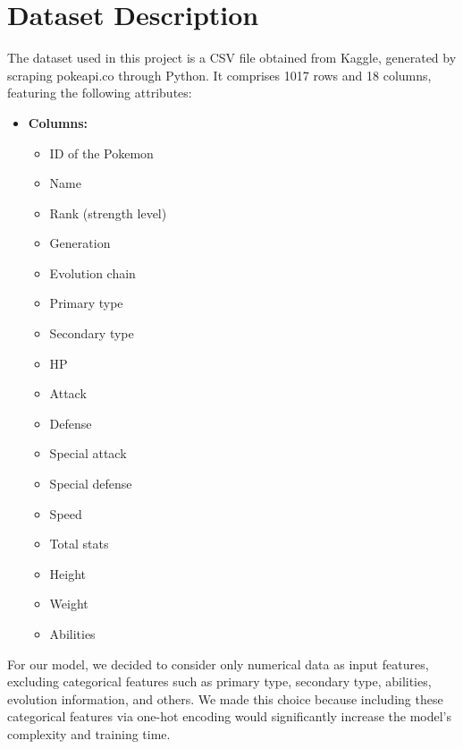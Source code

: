 \documentclass[conference]{IEEEtran}
\begin{document}
    \chapter{Dataset Description}
  The dataset used in this project is a CSV file obtained from Kaggle, generated by scraping pokeapi.co through Python. It comprises 1017 rows and 18 columns, featuring the following attributes:

\begin{itemize}
    \item \textbf{Columns:} 
    \begin{itemize}
        \item ID of the Pokemon
        \item Name
        \item Rank (strength level)
        \item Generation
        \item Evolution chain
        \item Primary type
        \item Secondary type
        \item HP
        \item Attack
        \item Defense
        \item Special attack
        \item Special defense
        \item Speed
        \item Total stats
        \item Height
        \item Weight
        \item Abilities
    \end{itemize}
\end{itemize}

For our model, we decided to consider only numerical data as input features, excluding categorical features such as primary type, secondary type, abilities, evolution information, and others. We made this choice because including these categorical features via one-hot encoding would significantly increase the model's complexity and training time.
\end{document}
